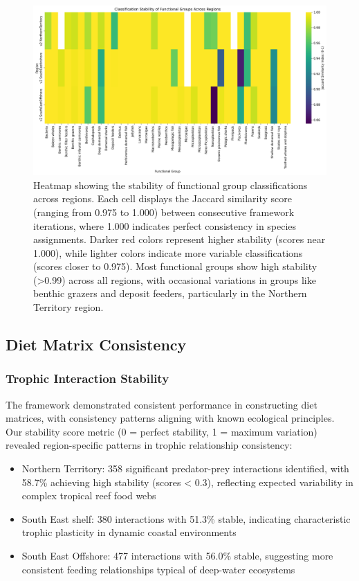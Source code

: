 \begin{figure}[htbp]
    \centering
    \includegraphics[width=\textwidth]{figures/group_stability_heatmap.png}
    \caption{Heatmap showing the stability of functional group classifications across regions. Each cell displays the Jaccard similarity score (ranging from 0.975 to 1.000) between consecutive framework iterations, where 1.000 indicates perfect consistency in species assignments. Darker red colors represent higher stability (scores near 1.000), while lighter colors indicate more variable classifications (scores closer to 0.975). Most functional groups show high stability (>0.99) across all regions, with occasional variations in groups like benthic grazers and deposit feeders, particularly in the Northern Territory region.}
    \label{fig:stability_heatmap}
\end{figure}



\subsection{Diet Matrix Consistency}

\subsubsection{Trophic Interaction Stability}
The framework demonstrated consistent performance in constructing diet matrices, with consistency patterns aligning with known ecological principles. Our stability score metric (0 = perfect stability, 1 = maximum variation) revealed region-specific patterns in trophic relationship consistency:

\begin{itemize}
    \item Northern Territory: 358 significant predator-prey interactions identified, with 58.7\% achieving high stability (scores < 0.3), reflecting expected variability in complex tropical reef food webs
    \item South East shelf: 380 interactions with 51.3\% stable, indicating characteristic trophic plasticity in dynamic coastal environments
    \item South East Offshore: 477 interactions with 56.0\% stable, suggesting more consistent feeding relationships typical of deep-water ecosystems
\end{itemize}

